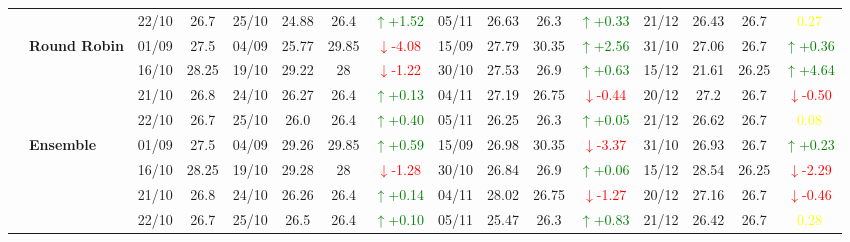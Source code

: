 \documentclass{ieeeaccess}
\begin{document}
{\begin{longtable}{llcc|cccc|cccc|cccc}
&
& 22/10 & 26.7 & 25/10 & 24.88 & 26.4 & \textcolor{green}{\(\uparrow\)+1.52} & 05/11 & 26.63 & 26.3 & \textcolor{green}{\(\uparrow\)+0.33} & 21/12 & 26.43 & 26.7 & \textcolor{yellow}{0.27} \\
\cmidrule(lr){2-16}


& \textbf{Round Robin}
& 01/09 & 27.5 & 04/09 & 25.77 & 29.85 & \textcolor{red}{\(\downarrow\)-4.08} & 15/09 & 27.79 & 30.35 & \textcolor{green}{\(\uparrow\)+2.56} & 31/10 & 27.06 & 26.7 & \textcolor{green}{\(\uparrow\)+0.36} \\

& 
& 16/10 & 28.25 & 19/10 & 29.22 & 28 & \textcolor{red}{\(\downarrow\)-1.22} & 30/10 & 27.53 & 26.9 & \textcolor{green}{\(\uparrow\)+0.63} & 15/12 & 21.61 & 26.25 & \textcolor{green}{\(\uparrow\)+4.64} \\

& 
& 21/10 & 26.8 & 24/10 & 26.27 & 26.4 & \textcolor{green}{\(\uparrow\)+0.13} & 04/11 & 27.19 & 26.75 & \textcolor{red}{\(\downarrow\)-0.44} & 20/12 & 27.2 & 26.7 & \textcolor{red}{\(\downarrow\)-0.50} \\

&
& 22/10 & 26.7 & 25/10 & 26.0 & 26.4 & \textcolor{green}{\(\uparrow\)+0.40} & 05/11 & 26.25 & 26.3 & \textcolor{green}{\(\uparrow\)+0.05} & 21/12 & 26.62 & 26.7 & \textcolor{yellow}{0.08} \\
\cmidrule(lr){2-16}


& \textbf{Ensemble}
& 01/09 & 27.5 & 04/09 & 29.26 & 29.85& \textcolor{green}{\(\uparrow\)+0.59} & 15/09 & 26.98 & 30.35 & \textcolor{red}{\(\downarrow\)-3.37} & 31/10 & 26.93 & 26.7 & \textcolor{green}{\(\uparrow\)+0.23} \\

& 
& 16/10 & 28.25 & 19/10 & 29.28 & 28 & \textcolor{red}{\(\downarrow\)-1.28} & 30/10 & 26.84 & 26.9 & \textcolor{green}{\(\uparrow\)+0.06} & 15/12 & 28.54 & 26.25 & \textcolor{red}{\(\downarrow\)-2.29} \\

& 
& 21/10 & 26.8 & 24/10 & 26.26 & 26.4 & \textcolor{green}{\(\uparrow\)+0.14} & 04/11 & 28.02 & 26.75 & \textcolor{red}{\(\downarrow\)-1.27} & 20/12 & 27.16 & 26.7 & \textcolor{red}{\(\downarrow\)-0.46} \\

&
& 22/10 & 26.7 & 25/10 & 26.5 & 26.4 & \textcolor{green}{\(\uparrow\)+0.10} & 05/11 & 25.47 & 26.3 & \textcolor{green}{\(\uparrow\)+0.83} & 21/12 & 26.42 & 26.7 & \textcolor{yellow}{0.28} \\
\midrule




\end{longtable}}
\end{document}
